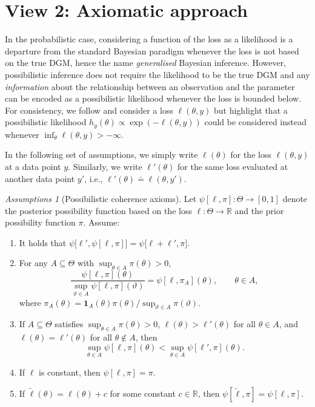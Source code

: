 \documentclass[accepted]{uai2026} %
\theoremstyle{remark}
\newtheorem*{assumptions*}{Assumptions}
\begin{document}
\section{View 2: Axiomatic approach}
\label{sec:5}

In the probabilistic case, considering a function of the loss as a likelihood is a departure from the standard Bayesian paradigm whenever the loss is not based on the true DGM, hence the name \emph{generalised} Bayesian inference. However, possibilistic inference does not require the likelihood to be the true DGM and any \emph{information} about the relationship between an observation and the parameter can be encoded as a possibilistic likelihood whenever the loss is bounded below. For consistency, we follow \citet{bissiri2016general} and consider a loss $\ell(\theta, y)$ but highlight that a possibilistic likelihood $h_y(\theta) \propto \exp(-\ell(\theta, y))$ could be considered instead whenever $\inf_{\theta} \ell(\theta, y) > -\infty$.

In the following set of assumptions, we simply write $\ell(\theta)$ for the loss $\ell(\theta, y)$ at a data point $y$. Similarly, we write $\ell'(\theta)$ for the same loss evaluated at another data point $y'$, i.e., $\ell'(\theta) \doteq \ell(\theta, y')$.

\begin{assumptions*}[Possibilistic coherence axioms]
Let $\psi[\ell,\pi]:\Theta\to[0,1]$ denote the posterior possibility function based on the loss $\ell : \Theta \to \mathbb{R}$ and the prior possibility function $\pi$. Assume:
\begin{enumerate}[label=A2.\arabic*,leftmargin=25pt]
\item\label{A1}
It holds that $\psi\big[\ell', \psi[\ell,\pi]\big] = \psi\big[\ell+\ell', \pi\big]$.
\item\label{A2}
For any $A\subseteq\Theta$ with $\sup_{\theta\in A} \pi(\theta)>0$,
\[
\frac{\psi[\ell,\pi](\theta)}{\sup_{\vartheta \in A}\psi[\ell,\pi](\vartheta)} = \psi[\ell,\pi_A](\theta),\qquad \theta \in A,
\]
where $\pi_A(\theta)=\bm{1}_A(\theta) \pi(\theta)\big/\sup_{\vartheta \in A} \pi(\vartheta)$.
\item\label{A3} If $A\subseteq\Theta$ satisfies $\sup_{\theta\in A}\pi(\theta)>0$, $\ell(\theta) > \ell'(\theta)$ for all $\theta \in A$, and $\ell(\theta) = \ell'(\theta)$ for all
$\theta \notin A$, then
\[
\sup_{\theta\in A}\psi[\ell,\pi](\theta) < \sup_{\theta\in A}\psi[\ell',\pi](\theta).
\]
\item\label{A4}
If $\ell$ is constant, then $\psi[\ell,\pi] = \pi$.
\item\label{A5}
If $\tilde{\ell}(\theta) = \ell(\theta) + c$ for some constant $c\in\mathbb{R}$, then $\psi[\tilde{\ell},\pi] = \psi[\ell,\pi]$.
\end{enumerate}
\end{assumptions*}
\end{document}
